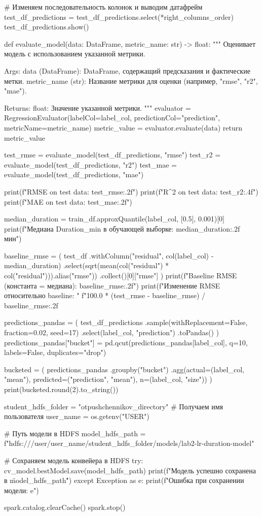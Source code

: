 \begin{code}
# Изменяем последовательность колонок и выводим датафрейм
test_df_predictions = test_df_predictions.select(*right_columns_order)
test_df_predictions.show()

def evaluate_model(data: DataFrame, metric_name: str) -> float:
    """
    Оценивает модель с использованием указанной метрики.

    Args:
        data (DataFrame): DataFrame, содержащий предсказания и фактические метки.
        metric_name (str): Название метрики для оценки
            (например, "rmse", "r2", "mae").

    Returns:
        float: Значение указанной метрики.
    """
    evaluator = RegressionEvaluator(labelCol=label_col,
                                    predictionCol="prediction",
                                    metricName=metric_name)
    metric_value = evaluator.evaluate(data)
    return metric_value

test_rmse = evaluate_model(test_df_predictions, "rmse")
test_r2 = evaluate_model(test_df_predictions, "r2")
test_mae = evaluate_model(test_df_predictions, "mae")

print(f"RMSE on test data: {test_rmse:.2f}")
print(f"R^2  on test data: {test_r2:.4f}")
print(f"MAE  on test data: {test_mae:.2f}")

median_duration = train_df.approxQuantile(label_col, [0.5], 0.001)[0]
print(f"Медиана Duration_min в обучающей выборке: {median_duration:.2f} мин")

baseline_rmse = (
    test_df
    .withColumn("residual", col(label_col) - median_duration)
    .select(sqrt(mean(col("residual") * col("residual"))).alias("rmse"))
    .collect()[0]["rmse"]
)
print(f"Baseline RMSE (константа = медиана): {baseline_rmse:.2f}")
print(f"Изменение RMSE относительно baseline: "
      f"{100.0 * (test_rmse - baseline_rmse) / baseline_rmse:.2f} %


predictions_pandas = (
    test_df_predictions
    .sample(withReplacement=False, fraction=0.02, seed=17)
    .select(label_col, "prediction")
    .toPandas()
)
predictions_pandas["bucket"] = pd.qcut(predictions_pandas[label_col],
                                       q=10,
                                       labels=False,
                                       duplicates="drop")

bucketed = (
    predictions_pandas
    .groupby("bucket")
    .agg(actual=(label_col, "mean"),
         predicted=("prediction", "mean"),
         n=(label_col, "size"))
)
print(bucketed.round(2).to_string())

student_hdfs_folder = "otpushchennikov_directory"
# Получаем имя пользователя
user_name = os.getenv("USER")

# Путь модели в HDFS
model_hdfs_path = f"hdfs:///user/{user_name}/{student_hdfs_folder}/models/lab2-lr-duration-model"

# Сохраняем модель конвейера в HDFS
try:
    cv_model.bestModel.save(model_hdfs_path)
    print(f"Модель успешно сохранена в \"{model_hdfs_path}\"")
except Exception as e:
    print(f"Ошибка при сохранении модели: {e}")

spark.catalog.clearCache()
spark.stop()
\end{code}

